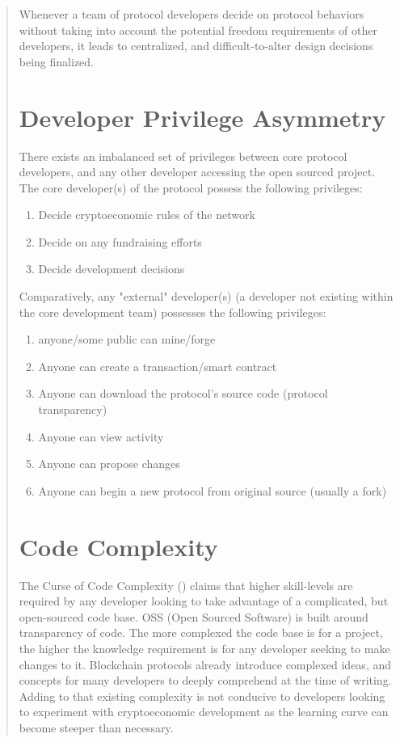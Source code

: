 \documentclass[12pt, titlepage, twocolumn]{report}
\begin{document}
\begin{quotation}
Whenever a team of protocol developers decide on protocol behaviors without taking into account the potential freedom requirements of other developers, it leads to centralized, and difficult-to-alter design decisions being finalized. 


\section{Developer Privilege Asymmetry}
There exists an imbalanced set of privileges between core protocol developers, and any other developer accessing the open sourced project. The core developer(s) of the protocol possess the following privileges:

\begin{enumerate}
	\item Decide cryptoeconomic rules of the network
	\item Decide on any fundraising efforts
	\item Decide development decisions
\end{enumerate}

Comparatively, any "external" developer(s) (a developer not existing within the core development team) possesses the following privileges:

\begin{enumerate}
	\item anyone/some public can mine/forge
	\item Anyone can create a transaction/smart contract
	\item Anyone can download the protocol's source code (protocol transparency)
	\item Anyone can view activity
	\item Anyone can propose changes
	\item Anyone can begin a new protocol from original source (usually a fork)
\end{enumerate}


\section{Code Complexity}

The Curse of Code Complexity () claims that higher skill-levels are required by any developer looking to take advantage of a complicated, but open-sourced code base. OSS (Open Sourced Software) is built around transparency of code. The more complexed the code base is for a project, the higher the knowledge requirement is for any developer seeking to make changes to it. Blockchain protocols already introduce complexed ideas, and concepts for many developers to deeply comprehend at the time of writing. Adding to that existing complexity is not conducive to developers looking to experiment with cryptoeconomic development as the learning curve can become steeper than necessary.


\end{quotation}
\end{document}
